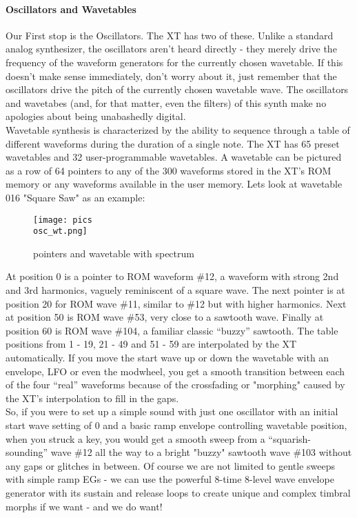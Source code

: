 \paragraph{Oscillators and Wavetables}
Our First stop is the Oscillators. The XT has two of these. Unlike a standard analog synthesizer, the oscillators aren't heard directly - they merely drive the frequency of the waveform generators for the currently chosen wavetable. If this doesn't make sense immediately, don't worry about it, just remember that the oscillators drive the pitch of the currently chosen wavetable wave. The oscillators and wavetabes (and, for that matter, even the filters) of this synth make no apologies about being unabashedly digital.\\
Wavetable synthesis is characterized by the ability to sequence through a table of different waveforms during the duration of a single note. The XT has 65 preset wavetables and 32 user-programmable wavetables. A wavetable can be pictured as a row of 64 pointers to any of the 300 waveforms stored in the XT's ROM memory or any waveforms available in the user memory. Lets look at wavetable 016 "Square Saw" as an example:
\begin{figure}[ht!]
	\centering
	\texttt{[image: pics\\osc\_wt.png]}
	\caption{pointers and wavetable with spectrum}
	\label{osc_wt}
\end{figure}
At position 0 is a pointer to ROM waveform \#12, a waveform with strong 2nd and 3rd harmonics, vaguely reminiscent of a square wave. The next pointer is at position 20 for ROM wave \#11, similar to \#12 but with higher harmonics. Next at position 50 is ROM wave \#53, very close to a sawtooth wave. Finally at position 60 is ROM wave \#104, a familiar classic ``buzzy'' sawtooth. The table positions from 1 - 19, 21 - 49 and 51 - 59 are interpolated by the XT automatically. If you move the start wave up or down the wavetable with an envelope, LFO or even the modwheel, you get a smooth transition between each of the four ``real'' waveforms because of the crossfading or "morphing" caused by the XT's interpolation to fill in the gaps.\\
So, if you were to set up a simple sound with just one oscillator with an initial start wave setting of 0 and a basic ramp envelope controlling wavetable position, when you struck a key, you would get a smooth sweep from a ``squarish-sounding'' wave \#12 all the way to a bright "buzzy" sawtooth wave \#103 without any gaps or glitches in between. Of course we are not limited to gentle sweeps with simple ramp EGs - we can use the powerful 8-time 8-level wave envelope generator with its sustain and release loops to create unique and complex timbral morphs if we want - and we do want!\\
